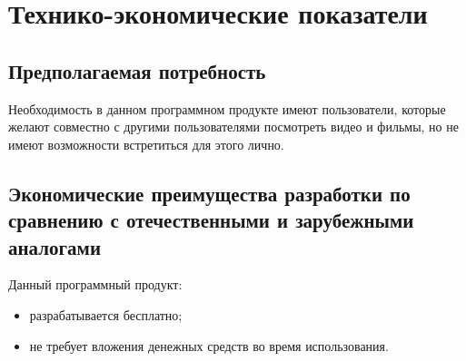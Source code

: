 \section{Технико-экономические показатели}

\subsection{Предполагаемая потребность}

Необходимость в данном программном продукте имеют пользователи, которые желают совместно с другими пользователями
посмотреть видео и фильмы, но не имеют возможности встретиться для этого лично.

\subsection{Экономические преимущества разработки по сравнению с отечественными и зарубежными аналогами}

Данный программный продукт:
\begin{itemize}
    \item разрабатывается бесплатно;
    \item не требует вложения денежных средств во время использования.
\end{itemize}